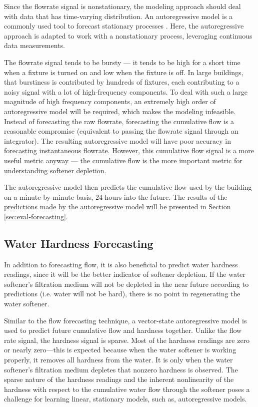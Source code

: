 Since the flowrate signal is nonstationary, the modeling approach should deal with data that has time-varying distribution.
 An autoregressive model is a commonly used tool to forecast stationary processes \cite{oppenheim2010discrete}.
 Here, the autoregressive approach is adapted to work with a nonstationary process, leveraging continuous data measurements.

The flowrate signal tends to be bursty --- it tends to be high for a short time when a fixture is turned on and low when the fixture is off.
 In large buildings, that burstiness is contributed by hundreds of fixtures, each contributing to a noisy signal with a lot of high-frequency components.
 To deal with such a large magnitude of high frequency components, an extremely high order of autoregressive model will be required, which makes the modeling infeasible.
 Instead of forecasting the raw flowrate, forecasting the cumulative flow is a reasonable compromise (equivalent to passing the flowrate signal through an integrator).
 The resulting autoregressive model will have poor accuracy in forecasting instantaneous flowrate.
 However, this cumulative flow signal is a more useful metric anyway --- the cumulative flow is the more important metric for understanding softener depletion.

The autoregressive model then predicts the cumulative flow used by the building on a minute-by-minute basis, 24 hours into the future.
 The results of the predictions made by the autoregressive model will be presented in Section \ref{sec:eval-forecasting}.

\subsection{Water Hardness Forecasting}

In addition to forecasting flow, it is also beneficial to predict water hardness readings, since it will be the better indicator of softener depletion.
 If the water softener's filtration medium will not be depleted in the near future according to predictions (i.e. water will not be hard), there is no point in regenerating the water softener.


Similar to the flow forecasting technique, a vector-state autoregressive model is used to predict future cumulative flow and hardness together.
 Unlike the flow rate signal, the hardness signal is sparse.
 Most of the hardness readings are zero or nearly zero---this is expected because when the water softener is working properly, it removes all hardness from the water.
 It is only when the water softener's filtration medium depletes that nonzero hardness is observed.
 The sparse nature of the hardness readings and the inherent nonlinearity of the hardness with respect to the cumulative water flow through the softener poses a challenge for learning linear, stationary models, such as, autoregressive models.


